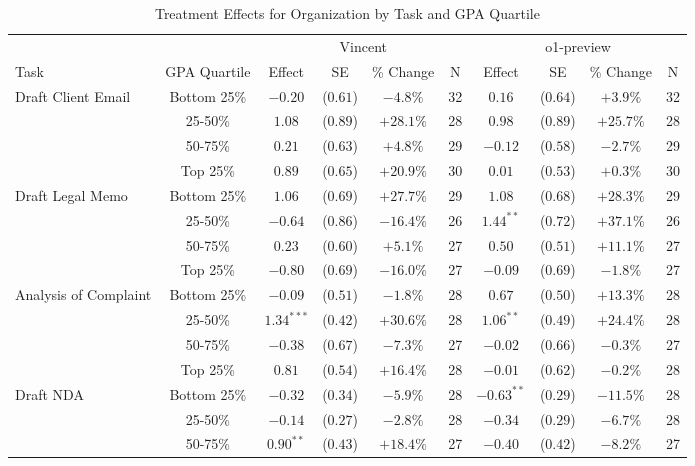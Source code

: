 \begin{table}[!htbp]
\centering
\caption{Treatment Effects for Organization by Task and GPA Quartile}
\label{tab:organization_gpa}
\begin{tabular}{lccccccccc}
\hline\hline
& & \multicolumn{4}{c}{Vincent} & \multicolumn{4}{c}{o1-preview} \\
\cline{3-10}
Task & GPA Quartile & Effect & SE & \% Change & N & Effect & SE & \% Change & N \\
\hline
\multirow{4}{*}{Draft Client Email} & Bottom 25\% & $-0.20$ & ($0.61$) & $-4.8\%$ & 32 & $0.16$ & ($0.64$) & $+3.9\%$ & 32 \\
& 25-50\% & $1.08$ & ($0.89$) & $+28.1\%$ & 28 & $0.98$ & ($0.89$) & $+25.7\%$ & 28 \\
& 50-75\% & $0.21$ & ($0.63$) & $+4.8\%$ & 29 & $-0.12$ & ($0.58$) & $-2.7\%$ & 29 \\
& Top 25\% & $0.89$ & ($0.65$) & $+20.9\%$ & 30 & $0.01$ & ($0.53$) & $+0.3\%$ & 30 \\
\hline
\multirow{4}{*}{Draft Legal Memo} & Bottom 25\% & $1.06$ & ($0.69$) & $+27.7\%$ & 29 & $1.08$ & ($0.68$) & $+28.3\%$ & 29 \\
& 25-50\% & $-0.64$ & ($0.86$) & $-16.4\%$ & 26 & $1.44^{**}$ & ($0.72$) & $+37.1\%$ & 26 \\
& 50-75\% & $0.23$ & ($0.60$) & $+5.1\%$ & 27 & $0.50$ & ($0.51$) & $+11.1\%$ & 27 \\
& Top 25\% & $-0.80$ & ($0.69$) & $-16.0\%$ & 27 & $-0.09$ & ($0.69$) & $-1.8\%$ & 27 \\
\hline
\multirow{4}{*}{Analysis of Complaint} & Bottom 25\% & $-0.09$ & ($0.51$) & $-1.8\%$ & 28 & $0.67$ & ($0.50$) & $+13.3\%$ & 28 \\
& 25-50\% & $1.34^{***}$ & ($0.42$) & $+30.6\%$ & 28 & $1.06^{**}$ & ($0.49$) & $+24.4\%$ & 28 \\
& 50-75\% & $-0.38$ & ($0.67$) & $-7.3\%$ & 27 & $-0.02$ & ($0.66$) & $-0.3\%$ & 27 \\
& Top 25\% & $0.81$ & ($0.54$) & $+16.4\%$ & 28 & $-0.01$ & ($0.62$) & $-0.2\%$ & 28 \\
\hline
\multirow{4}{*}{Draft NDA} & Bottom 25\% & $-0.32$ & ($0.34$) & $-5.9\%$ & 28 & $-0.63^{**}$ & ($0.29$) & $-11.5\%$ & 28 \\
& 25-50\% & $-0.14$ & ($0.27$) & $-2.8\%$ & 28 & $-0.34$ & ($0.29$) & $-6.7\%$ & 28 \\
& 50-75\% & $0.90^{**}$ & ($0.43$) & $+18.4\%$ & 27 & $-0.40$ & ($0.42$) & $-8.2\%$ & 27 \\

\end{tabular}
\end{table}
